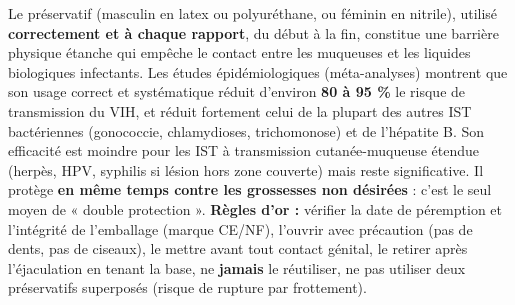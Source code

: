 \documentclass[11pt]{article}
\newcommand{\cle}[1]{{\popxbold\color{popdark}#1}}
\begin{document}
\begin{exemplebox}
Le \cle{préservatif} (masculin en latex ou polyuréthane, ou féminin en nitrile), utilisé \textbf{correctement et à chaque rapport}, du début à la fin, constitue une barrière physique étanche qui empêche le contact entre les muqueuses et les liquides biologiques infectants. Les études épidémiologiques (méta-analyses) montrent que son usage correct et systématique réduit d'environ \textbf{80 à 95 \%} le risque de transmission du VIH, et réduit fortement celui de la plupart des autres IST bactériennes (gonococcie, chlamydioses, trichomonose) et de l'hépatite B. Son efficacité est moindre pour les IST à transmission cutanée-muqueuse étendue (herpès, HPV, syphilis si lésion hors zone couverte) mais reste significative. Il protège \textbf{en même temps contre les grossesses non désirées} : c'est le seul moyen de « double protection ».
\textbf{Règles d'or :} vérifier la date de péremption et l'intégrité de l'emballage (marque CE/NF), l'ouvrir avec précaution (pas de dents, pas de ciseaux), le mettre avant tout contact génital, le retirer après l'éjaculation en tenant la base, ne \textbf{jamais} le réutiliser, ne pas utiliser deux préservatifs superposés (risque de rupture par frottement).
\end{exemplebox}
\end{document}
